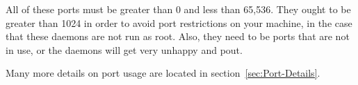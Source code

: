 All of these ports must be greater than 0 and less than 65,536.
They ought to be greater than 1024 in order to avoid port restrictions
on your machine, in the case that these daemons are not run as root.
Also, they need to be ports that are not in use,
or the daemons will get very unhappy and pout.

Many more details on port usage are located in
section~\ref{sec:Port-Details}.


%

